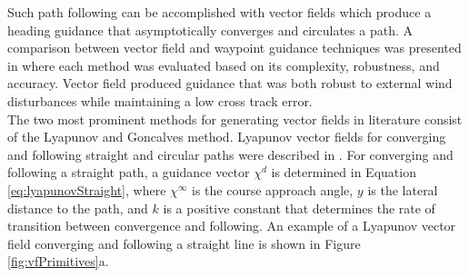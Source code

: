 \documentclass[conf]{new-aiaa}
\begin{document}
 
%
%

	
Such path following can be accomplished with vector fields which produce a heading guidance that asymptotically converges and circulates a path. A comparison between vector field and waypoint guidance techniques was presented in \cite{sujit_unmanned_2014} where each method was evaluated based on its complexity, robustness, and accuracy. Vector field produced guidance that was both robust to external wind disturbances while maintaining a low cross track error. \\


The two most prominent methods for generating vector fields in literature consist of the Lyapunov \cite{nelson_cooperative_2005,nelson_vector_2006,nelson_vector_2007,frew_cooperative_2007,miao_orthogonal_2016,griffiths_vector_2006} and Goncalves \cite{goncalves_artificial_2009,goncalves_circulation_2010,goncalves_vector_2010,gerlach_autonomous_2014} method. Lyapunov vector fields for converging and following straight and circular paths were described in \cite{nelson_cooperative_2005}. For converging and following a straight path, a guidance vector $\chi^{d}$ is determined in Equation \ref{eq:lyapunovStraight}, where $\chi^{\infty}$ is the course approach angle, $y$ is the lateral distance to the path, and $k$ is a positive constant that determines the rate of transition between convergence and following. An example of a Lyapunov vector field converging and following a straight line is shown in Figure \ref{fig:vfPrimitives}a.
\end{document}
